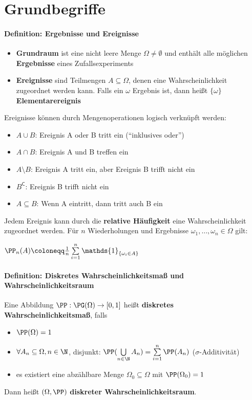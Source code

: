 \section{Grundbegriffe}
\paragraph{Definition: Ergebnisse und Ereignisse}
\begin{itemize}
	\item \textbf{Grundraum} ist eine nicht leere Menge $\Omega\neq\emptyset$ und enthält alle möglichen \textbf{Ergebnisse} eines Zufallsexperiments
	\item \textbf{Ereignisse} sind Teilmengen $A\subseteq\Omega$, denen eine Wahrscheinlichkeit zugeordnet werden kann. 
	Falls ein $\omega$ Ergebnis ist, dann heißt $\{\omega\}$ \textbf{Elementarereignis}
\end{itemize}
Ereignisse können durch Mengenoperationen logisch verknüpft werden:
\begin{itemize}
	\item $A\cup B$: Ereignis A oder B tritt ein (\enquote{inklusives oder})
	\item $A\cap B$: Ereignis A und B treffen ein
	\item $A\setminus B$: Ereignis A tritt ein, aber Ereignis B trifft nicht ein
	\item $B^{\mathsf{C}}$: Ereignis B trifft nicht ein
	\item $A\subseteq B$: Wenn A eintritt, dann tritt auch B ein
\end{itemize}
Jedem Ereignis kann durch die \textbf{relative Häufigkeit} eine Wahrscheinlichkeit zugeordnet werden. 
Für $n$ Wiederholungen und Ergebnisse $\omega_1,\ldots,\omega_n\in\Omega$ gilt:
\begin{tightcenter}
	$\PP_n(A)\coloneqq\frac{1}{n}\sum\limits_{i=1}^{n} \mathds{1}_{\{\omega_i \in A\}}$
\end{tightcenter}

\paragraph{Definition: Diskretes Wahrscheinlichkeitsmaß und Wahrscheinlichkeitsraum}
Eine Abbildung $\PP:\PG(\Omega) \rightarrow [0,1]$ heißt \textbf{diskretes Wahrscheinlichkeitsmaß}, falls
\begin{itemize}
	\item $\PP(\Omega)=1$
	\item $\forall A_n \subseteq \Omega, n\in\N$, disjunkt: $\PP(\bigcup\limits_{n\in \N} A_n)=\sum\limits_{i=1}^{n} \PP(A_n)$ \qquad($\sigma$-Additivität)
	\item es existiert eine abzählbare Menge $\Omega_0\subseteq\Omega$ mit $\PP(\Omega_0)=1$
\end{itemize}
Dann heißt $(\Omega, \PP)$ \textbf{diskreter Wahrscheinlichkeitsraum}.

